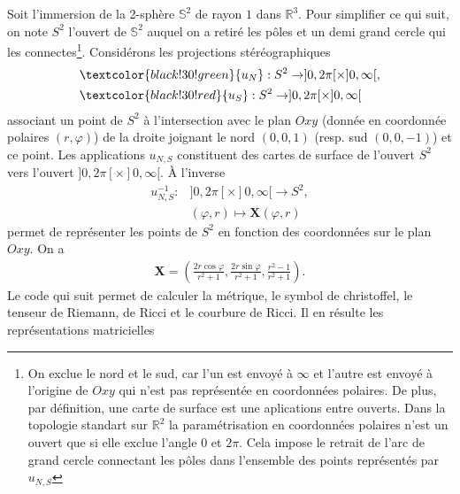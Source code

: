 Soit l'immersion de la 2-sphère $\mathbb{S}^2$ de rayon $1$ dans $\mathbb{R}^3$. Pour simplifier ce qui suit, on note $S^2$ l'ouvert de $\mathbb{S}^2$ auquel on a retiré les pôles et un demi grand cercle qui les connectes\footnote{On exclue le nord et le sud, car l'un est envoyé à $\infty$ et l'autre est envoyé à l'origine de $Oxy$ qui n'est pas représentée en coordonnées polaires. De plus, par définition, une carte de surface est une aplications entre ouverts. Dans la topologie standart sur $\mathbb{R}^2$ la paramétrisation en coordonnées polaires n'est un ouvert que si elle exclue l'angle $0$ et $2\pi$. Cela impose le retrait de l'arc de grand cercle connectant les pôles dans l'ensemble des points représentés par $u_{N, S}$}. Considérons les projections stéréographiques 
\begin{align*}
    &\textcolor{black!30!green}{u_N} : S^2 \to  ] 0, 2\pi[ \times ]0, \infty[,\\
    &\textcolor{black!30!red}{u_S} : S^2 \to  ]0, 2\pi[ \times ]0, \infty[
\end{align*}
 associant un point de $S^2$ à l'intersection avec le plan $Oxy$ (donnée en coordonnée polaires $(r, \varphi)$) de la droite joignant le \textcolor{black!30!green}{nord $(0, 0, 1)$} (resp. \textcolor{black!30!red}{sud $(0, 0, -1)$}) et ce point. Les applications $u_{N, S}$ constituent des cartes de surface de l'ouvert $S^2$ vers l'ouvert $]0, 2\pi[ \times ]0, \infty[$. À l'inverse
 \begin{align*}
    u_{N, S}^{-1} : &]0, 2\pi[ \times ]0, \infty[ \to S^2,\\
    & (\varphi, r) \mapsto \mathbf{X}(\varphi, r) 
 \end{align*} 
  permet de représenter les points de $S^2$ en fonction des coordonnées sur le plan $Oxy$. On a
 \begin{align*}
    \mathbf{X}=\left(\frac{2 r \cos \varphi}{r^2+1}, \frac{2 r \sin \varphi}{r^2+1}, \frac{r^2-1}{r^2+1}\right).
 \end{align*}
 Le code qui suit permet de calculer la métrique, le symbol de christoffel, le tenseur de Riemann, de Ricci et le courbure de Ricci. Il en résulte les représentations matricielles
